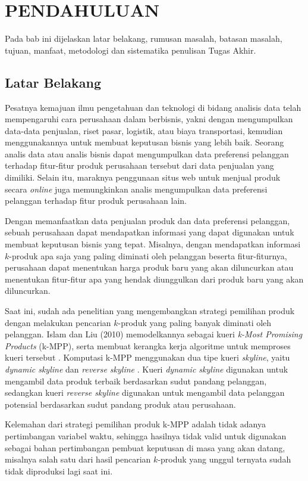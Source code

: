 \chapter{PENDAHULUAN}
\tab Pada bab ini dijelaskan latar belakang, rumusan masalah, batasan masalah, tujuan, manfaat, metodologi dan sistematika penulisan Tugas Akhir.

\section{Latar Belakang}
\tab Pesatnya kemajuan ilmu pengetahuan dan teknologi di bidang analisis data telah mempengaruhi cara perusahaan dalam berbisnis, yakni dengan mengumpulkan data-data penjualan, riset pasar, logistik, atau biaya transportasi, kemudian menggunakannya untuk membuat keputusan bisnis yang lebih baik. Seorang analis data atau analis bisnis dapat mengumpulkan data preferensi pelanggan terhadap fitur-fitur produk perusahaan tersebut dari data penjualan yang dimiliki. Selain itu, maraknya penggunaan situs web untuk menjual produk secara \textit{online} juga memungkinkan analis mengumpulkan data preferensi pelanggan terhadap fitur produk perusahaan lain.

Dengan memanfaatkan data penjualan produk dan data preferensi pelanggan, sebuah perusahaan dapat mendapatkan informasi yang dapat digunakan untuk membuat keputusan bisnis yang tepat. Misalnya, dengan mendapatkan informasi $k$-produk apa saja yang paling diminati oleh pelanggan beserta fitur-fiturnya, perusahaan dapat menentukan harga produk baru yang akan diluncurkan atau menentukan fitur-fitur apa yang hendak diunggulkan dari produk baru yang akan diluncurkan. 

\pagebreak
Saat ini, sudah ada penelitian yang mengembangkan strategi pemilihan produk dengan melakukan pencarian $k$-produk yang paling banyak diminati oleh pelanggan. Islam dan Liu (2010) memodelkannya sebagai kueri \textit{k-Most Promising Products} (k-MPP), serta membuat kerangka kerja algoritme untuk memproses kueri tersebut \cite{kmpp}. Komputasi k-MPP menggunakan dua tipe kueri \textit{skyline}, yaitu \textit{dynamic skyline} \cite{dynamic-skyline} dan \textit{reverse skyline} \cite{reverse-skyline}. Kueri \textit{dynamic skyline} digunakan untuk mengambil data produk terbaik berdasarkan sudut pandang pelanggan, sedangkan kueri \textit{reverse skyline} digunakan untuk mengambil data pelanggan potensial berdasarkan sudut pandang produk atau perusahaan.

Kelemahan dari strategi pemilihan produk k-MPP adalah tidak adanya pertimbangan variabel waktu, sehingga hasilnya tidak valid untuk digunakan sebagai bahan pertimbangan pembuat keputusan di masa yang akan datang, misalnya salah satu dari hasil pencarian $k$-produk yang unggul ternyata sudah tidak diproduksi lagi saat ini. 

